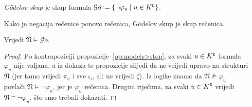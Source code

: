 \begin{definicija}[{name=[G\"odelov skup]}]
\emph{G\"odelov skup} je skup formula
    $\mathcal G\ddot o:=\{\lnot\varphi_u\mid u\in K\sp{{\scriptscriptstyle\complement}}\}$.
\end{definicija}
Kako je negacija rečenice ponovo rečenica, G\"odelov skup je skup rečenica.

\begin{propozicija}[{name=[istinitost G\"odelovog skupa rečenica u $\mathfrak N$]}]
Vrijedi $\mathfrak N\models\mathcal G\ddot o$.
\end{propozicija}
\begin{proof}
Po kontrapoziciji propozicije~\ref{pp:models>stop}, za svaki $u\in K\sp{{\scriptscriptstyle\complement}}$ formula $\varphi_u$ nije valjana, a iz dokaza te propozicije slijedi da ne vrijedi upravo na strukturi $\mathfrak N$ (jer tamo vrijedi $\pi_u$ i sve $\iota_i$, ali ne vrijedi $\zeta$). Iz logike znamo da $\mathfrak N\not\models\varphi_u$ povlači $\mathfrak N\models\lnot\varphi_u$, jer je $\varphi_u$ rečenica. Drugim riječima, za svaki $u\in K\sp{{\scriptscriptstyle\complement}}$ vrijedi $\mathfrak N\models\lnot\varphi_u$, što smo trebali dokazati.
\end{proof}

